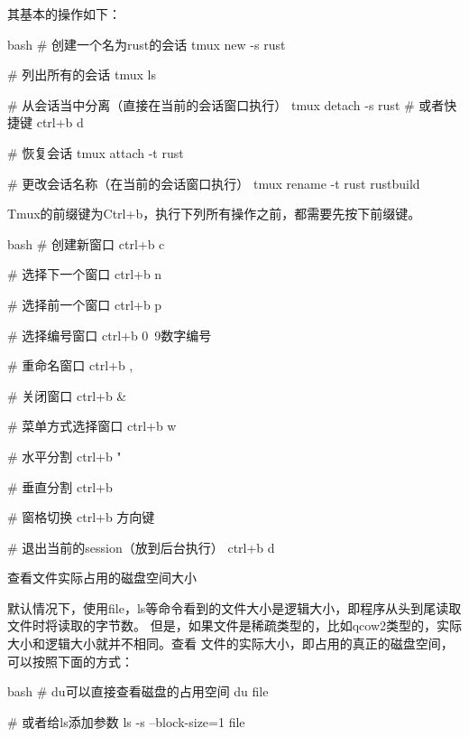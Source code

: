 \begin{outline}[enumerate]
其基本的操作如下：
\begin{code-block}{bash}
# 创建一个名为rust的会话
tmux new -s rust

# 列出所有的会话
tmux ls

# 从会话当中分离（直接在当前的会话窗口执行）
tmux detach -s rust
# 或者快捷键 ctrl+b d

# 恢复会话
tmux attach -t rust

# 更改会话名称（在当前的会话窗口执行）
tmux rename -t rust rustbuild
\end{code-block}

Tmux的前缀键为Ctrl+b，执行下列所有操作之前，都需要先按下前缀键。
\begin{code-block}{bash}
# 创建新窗口
ctrl+b c

# 选择下一个窗口
ctrl+b n

# 选择前一个窗口
ctrl+b p

# 选择编号窗口
ctrl+b 0~9数字编号

# 重命名窗口
ctrl+b ,

# 关闭窗口
ctrl+b &

# 菜单方式选择窗口
ctrl+b w

# 水平分割
ctrl+b "

# 垂直分割
ctrl+b %

# 窗格切换
ctrl+b 方向键

# 退出当前的session（放到后台执行）
ctrl+b d
\end{code-block}

\1 查看文件实际占用的磁盘空间大小

默认情况下，使用file，ls等命令看到的文件大小是逻辑大小，即程序从头到尾读取文件时将读取的字节数。
但是，如果文件是稀疏类型的，比如qcow2类型的，实际大小和逻辑大小就并不相同。查看
文件的实际大小，即占用的真正的磁盘空间，可以按照下面的方式：
\begin{code-block}{bash}
# du可以直接查看磁盘的占用空间
du file

# 或者给ls添加参数
ls -s --block-size=1 file
\end{code-block}

\end{outline}




